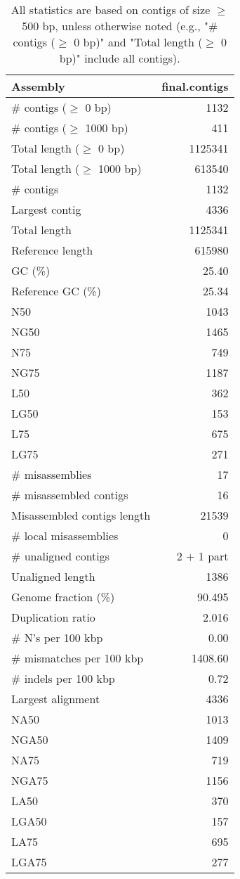 \documentclass[12pt,a4paper]{article}
\begin{document}
\begin{table}[ht]
\begin{center}
\caption{All statistics are based on contigs of size $\geq$ 500 bp, unless otherwise noted (e.g., "\# contigs ($\geq$ 0 bp)" and "Total length ($\geq$ 0 bp)" include all contigs).}
\begin{tabular}{|l*{1}{|r}|}
\hline
Assembly & final.contigs \\ \hline
\# contigs ($\geq$ 0 bp) & 1132 \\ \hline
\# contigs ($\geq$ 1000 bp) & 411 \\ \hline
Total length ($\geq$ 0 bp) & 1125341 \\ \hline
Total length ($\geq$ 1000 bp) & 613540 \\ \hline
\# contigs & 1132 \\ \hline
Largest contig & 4336 \\ \hline
Total length & 1125341 \\ \hline
Reference length & 615980 \\ \hline
GC (\%) & 25.40 \\ \hline
Reference GC (\%) & 25.34 \\ \hline
N50 & 1043 \\ \hline
NG50 & 1465 \\ \hline
N75 & 749 \\ \hline
NG75 & 1187 \\ \hline
L50 & 362 \\ \hline
LG50 & 153 \\ \hline
L75 & 675 \\ \hline
LG75 & 271 \\ \hline
\# misassemblies & 17 \\ \hline
\# misassembled contigs & 16 \\ \hline
Misassembled contigs length & 21539 \\ \hline
\# local misassemblies & 0 \\ \hline
\# unaligned contigs & 2 + 1 part \\ \hline
Unaligned length & 1386 \\ \hline
Genome fraction (\%) & 90.495 \\ \hline
Duplication ratio & 2.016 \\ \hline
\# N's per 100 kbp & 0.00 \\ \hline
\# mismatches per 100 kbp & 1408.60 \\ \hline
\# indels per 100 kbp & 0.72 \\ \hline
Largest alignment & 4336 \\ \hline
NA50 & 1013 \\ \hline
NGA50 & 1409 \\ \hline
NA75 & 719 \\ \hline
NGA75 & 1156 \\ \hline
LA50 & 370 \\ \hline
LGA50 & 157 \\ \hline
LA75 & 695 \\ \hline
LGA75 & 277 \\ \hline
\end{tabular}
\end{center}
\end{table}
\end{document}
